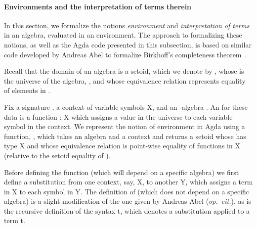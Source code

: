 \paragraph*{Environments and the interpretation of terms therein}
In this section, we formalize the notions \emph{environment} and \emph{interpretation of terms} in an algebra, evaluated in an environment. The approach to formalizing these notions, as well as the Agda code presented in this subsection, is based on similar code developed by Andreas Abel to formalize Birkhoff's completeness theorem~\cite{Abel:2021}.

\ifshort\else
Recall that the domain of an algebra  is a setoid, which we denote by , whose  is the universe of the algebra, , and whose equivalence relation represents equality of elements in .
\fi

Fix a signature , a context of variable symbols \ab X, and an -algebra . An  for these data is a function  : \ab X   which assigns a value in the universe to each variable symbol in the context.
We represent the notion of environment in Agda using a function, , which takes an algebra  and a context  and returns a setoid whose  has type \ab X   and whose equivalence relation is point-wise equality of functions in \ab X   (relative to the setoid equality of ).

Before defining the  function (which will depend on a specific algebra) we first
define a substitution from one context, say, \ab X, to another \ab Y, which assigns a term
in \ab X to each symbol in \ab Y.  The definition of  (which does not depend on a
specific algebra) is a slight modification of the one given by Andreas Abel
(\textit{op.~cit.}), as is the recursive definition of the syntax \af{[~\ab{σ}~]} \ab t,
which denotes a substitution  applied to a term \ab t.

